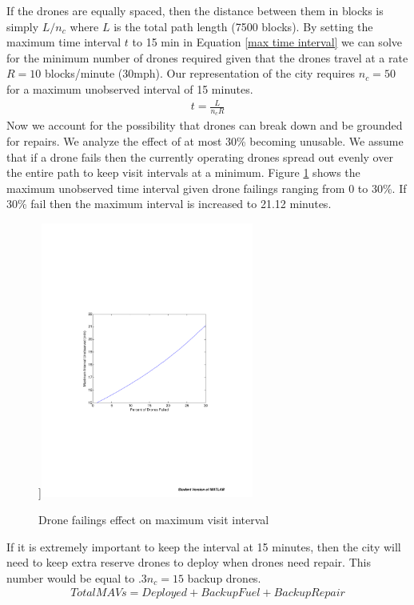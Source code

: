\documentclass{article}
\begin{document}
\newline\indent If the drones are equally spaced, then the distance between them in blocks is simply $L/n_{c}$ where $L$ is the total path length (7500 blocks). By setting the maximum time interval $t$ to 15 min in Equation \ref{max time interval} we can solve for the minimum number of drones required given that the drones travel at a rate $R = 10$ blocks/minute (30mph). Our representation of the city requires $n_{c} = 50$ for a maximum unobserved interval of 15 minutes.
\begin{eqnarray}
t = \frac{L}{n_{c}R} \label{max time interval}
\end{eqnarray}
\newline\indent Now we account for the possibility that drones can break down and be grounded for repairs. We analyze the effect of at most 30\% becoming unusable. We assume that if a drone fails then the currently operating drones spread out evenly over the entire path to keep visit intervals at a minimum. Figure \ref{failed} shows the maximum unobserved time interval given drone failings ranging from 0 to 30\%. If 30\% fail then the maximum interval is increased to 21.12 minutes. 
\begin{figure}[htb!]
    \centering]{{\includegraphics[width=7cm]{figures/failed_drones.pdf} }}%
    \caption{Drone failings effect on maximum visit interval}
   \label{failed}
\end{figure}
If it is extremely important to keep the interval at 15 minutes, then the city will need to keep extra reserve drones to deploy when drones need repair. This number would be equal to $.3n_{c} = 15$ backup drones.
\begin{eqnarray}
Total MAVs = Deployed + Backup Fuel + Backup Repair \label{totaldrones}
\end{eqnarray} 
\end{document}
